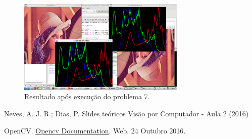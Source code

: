 \documentclass[portuguese, times, mirror]{revdetua}
\begin{document}
\begin{figure}[ht!]
\centering
\includegraphics[width=80mm]{img/ex7.png}
\caption{Resultado após execução do problema 7.}
\end{figure}



\begin{thebibliography}{1} %



Neves, A. J. R.; Dias, P. Slides teóricos Visão por Computador - Aula 2 (2016)


OpenCV. \href{hhttp://docs.opencv.org/}{Opencv Documentation}. Web. 24 Outubro 2016. 




\end{thebibliography}
\end{document}

